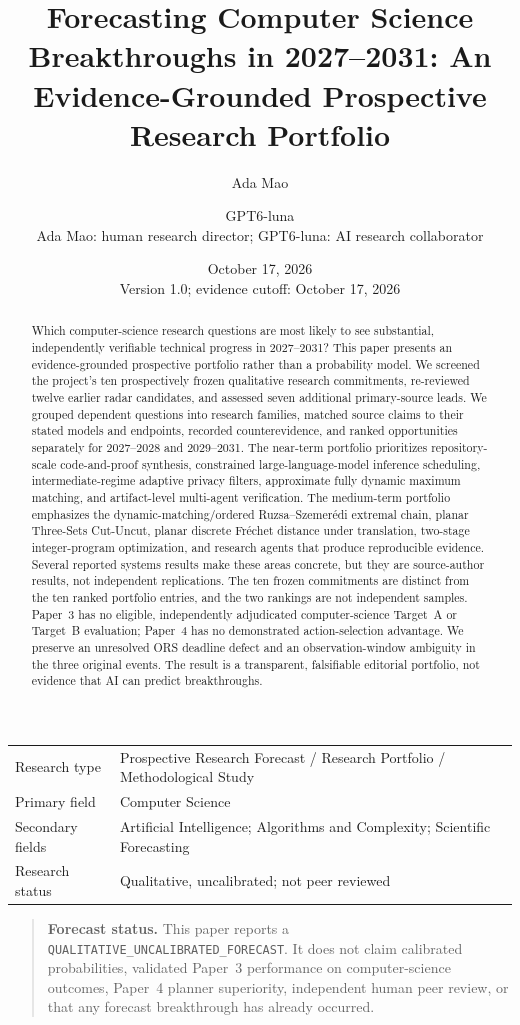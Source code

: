 \documentclass[11pt]{article}
\title{Forecasting Computer Science Breakthroughs in 2027--2031: An Evidence-Grounded Prospective Research Portfolio}
\author{Ada Mao \and GPT6-luna\\[3pt]\small Ada Mao: human research director; GPT6-luna: AI research collaborator}
\date{October 17, 2026\\[3pt]\small Version 1.0; evidence cutoff: October 17, 2026}
\begin{document}
\maketitle

\begin{center}
\begin{tabular}{ll}
Research type & Prospective Research Forecast / Research Portfolio / Methodological Study\\
Primary field & Computer Science\\
Secondary fields & Artificial Intelligence; Algorithms and Complexity; Scientific Forecasting\\
Research status & Qualitative, uncalibrated; not peer reviewed
\end{tabular}
\end{center}

\begin{quote}\textbf{Forecast status.} This paper reports a \texttt{QUALITATIVE\_UNCALIBRATED\_FORECAST}. It does not claim calibrated probabilities, validated Paper~3 performance on computer-science outcomes, Paper~4 planner superiority, independent human peer review, or that any forecast breakthrough has already occurred.\end{quote}

\begin{abstract}
Which computer-science research questions are most likely to see substantial, independently verifiable technical progress in 2027--2031? This paper presents an evidence-grounded prospective portfolio rather than a probability model. We screened the project's ten prospectively frozen qualitative research commitments, re-reviewed twelve earlier radar candidates, and assessed seven additional primary-source leads. We grouped dependent questions into research families, matched source claims to their stated models and endpoints, recorded counterevidence, and ranked opportunities separately for 2027--2028 and 2029--2031. The near-term portfolio prioritizes repository-scale code-and-proof synthesis, constrained large-language-model inference scheduling, intermediate-regime adaptive privacy filters, approximate fully dynamic maximum matching, and artifact-level multi-agent verification. The medium-term portfolio emphasizes the dynamic-matching/ordered Ruzsa--Szemer\'edi extremal chain, planar Three-Sets Cut-Uncut, planar discrete Fr\'echet distance under translation, two-stage integer-program optimization, and research agents that produce reproducible evidence. Several reported systems results make these areas concrete, but they are source-author results, not independent replications. The ten frozen commitments are distinct from the ten ranked portfolio entries, and the two rankings are not independent samples. Paper~3 has no eligible, independently adjudicated computer-science Target~A or Target~B evaluation; Paper~4 has no demonstrated action-selection advantage. We preserve an unresolved ORS deadline defect and an observation-window ambiguity in the three original events. The result is a transparent, falsifiable editorial portfolio, not evidence that AI can predict breakthroughs.
\end{abstract}
\end{document}
